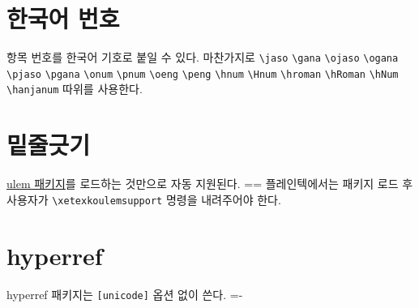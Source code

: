 \documentclass[a4paper]{article}
\def\logoko{\textsf{k}\kern-.2ex\textit{o}}
\def\kotex{\logoko\kern-.1ex .\kern-.1667em \hologo{TeX}}
\def\grayvrule{{\color{white!80!black}\vrule width 2pt}}
\newenvironment{plaintex}
  {\setbox0=\vbox\bgroup\hsize=\dimexpr\textwidth-12pt\relax\medbreak\small}
  {\medbreak\egroup \par\medskip
    \ifdim\ht0<\dimexpr\pagegoal-\pagetotal\relax
      \hbox{\grayvrule\kern10pt\box0}%
    \else
      \setbox2=\vsplit0 to\dimexpr\pagegoal-\pagetotal\relax
      \lineskip=0pt
      \ifvoid2 \else\hbox{\grayvrule\kern10pt\box2}\fi
      \ifvoid0 \else\hbox{\grayvrule\kern10pt\box0}\fi
    \fi \par\medskip }
\def\cs#1{\texttt{\textbackslash #1}}
\begin{document}
\section{한국어 번호}
항목 번호를 한국어 기호로 붙일 수 있다.  마찬가지로
\verb|\jaso| \verb|\gana| \verb|\ojaso| \verb|\ogana| \verb|\pjaso|
\verb|\pgana| \verb|\onum| \verb|\pnum| \verb|\oeng| \verb|\peng|
\verb|\hnum| \verb|\Hnum| \verb|\hroman| \verb|\hRoman| \verb|\hNum|
\verb|\hanjanum|
따위를 사용한다.

\section{밑줄긋기}
 \uline{ulem 패키지}를 로드하는 것만으로 자동 지원된다.
\begin{plaintex}
플레인텍에서는 패키지 로드 후 사용자가 \cs{xetexkoulemsupport}
명령을 내려주어야 한다.
\end{plaintex}

\section{hyperref}
hyperref 패키지는 \verb+[unicode]+ 옵션 없이 쓴다.
\hfill \fboxsep=-\fboxrule {}
\end{document}
